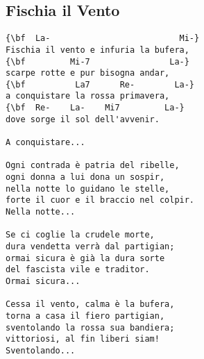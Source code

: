 \documentclass[a4paper]{article}
\begin{document}
\subsection{Fischia il Vento}
\begin{multicols}{2}\begin{Verbatim}[commandchars=\\\{\}]
{\bf  La-                          Mi-}
Fischia il vento e infuria la bufera,
{\bf         Mi-7                La-}
scarpe rotte e pur bisogna andar,
{\bf          La7      Re-        La-}
a conquistare la rossa primavera,
{\bf  Re-    La-    Mi7         La-}
dove sorge il sol dell'avvenir.

A conquistare...

Ogni contrada è patria del ribelle,
ogni donna a lui dona un sospir,
nella notte lo guidano le stelle,
forte il cuor e il braccio nel colpir.
Nella notte...

Se ci coglie la crudele morte,
dura vendetta verrà dal partigian;
ormai sicura è già la dura sorte
del fascista vile e traditor.
Ormai sicura...

Cessa il vento, calma è la bufera,
torna a casa il fiero partigian,
sventolando la rossa sua bandiera;
vittoriosi, al fin liberi siam!
Sventolando...


\end{Verbatim}
\end{multicols}\newpage
\end{document}
